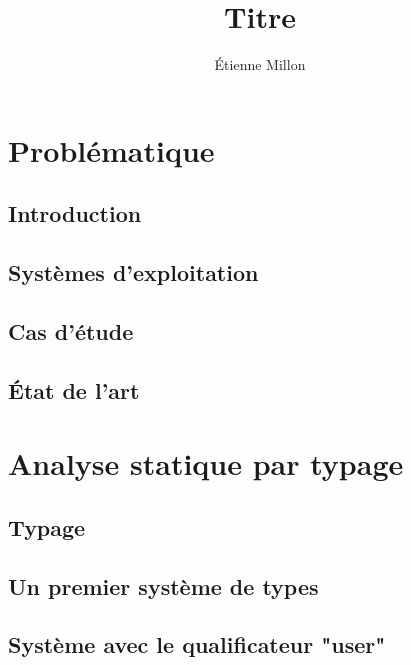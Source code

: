 \documentclass[a4paper,11pt]{memoir}
\title{Titre}
\author{Étienne Millon}
\begin{document}

\tableofcontents


\part{Problématique}

\chapter{Introduction}

\chapter{Systèmes d'exploitation}



\chapter{Cas d'étude}



\chapter{État de l'art}



\part{Analyse statique par typage}

\chapter{Typage}



\chapter{Un premier système de types}



\chapter{Système avec le qualificateur "user"}
\end{document}
